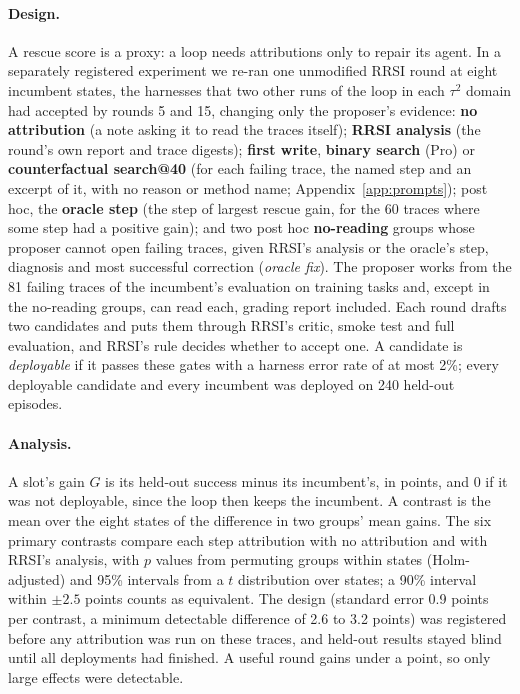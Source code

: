 \documentclass[11pt]{article}
\begin{document}
\paragraph{Design.} A rescue score is a proxy: a loop needs attributions only to repair its agent. In a separately registered experiment we re-ran one unmodified RRSI round at eight incumbent states, the harnesses that two other runs of the loop in each $\tau^2$ domain had accepted by rounds 5 and 15, changing only the proposer's evidence: \textbf{no attribution} (a note asking it to read the traces itself); \textbf{RRSI analysis} (the round's own report and trace digests); \textbf{first write}, \textbf{binary search} (Pro) or \textbf{counterfactual search@40} (for each failing trace, the named step and an excerpt of it, with no reason or method name; Appendix~\ref{app:prompts}); post hoc, the \textbf{oracle step} (the step of largest rescue gain, for the 60 traces where some step had a positive gain); and two post hoc \textbf{no-reading} groups whose proposer cannot open failing traces, given RRSI's analysis or the oracle's step, diagnosis and most successful correction (\emph{oracle fix}). The proposer works from the 81 failing traces of the incumbent's evaluation on training tasks and, except in the no-reading groups, can read each, grading report included. Each round drafts two candidates and puts them through RRSI's critic, smoke test and full evaluation, and RRSI's rule decides whether to accept one. A candidate is \emph{deployable} if it passes these gates with a harness error rate of at most 2\%; every deployable candidate and every incumbent was deployed on 240 held-out episodes.

\paragraph{Analysis.} A slot's gain $G$ is its held-out success minus its incumbent's, in points, and 0 if it was not deployable, since the loop then keeps the incumbent. A contrast is the mean over the eight states of the difference in two groups' mean gains. The six primary contrasts compare each step attribution with no attribution and with RRSI's analysis, with $p$ values from permuting groups within states (Holm-adjusted) and 95\% intervals from a $t$ distribution over states; a 90\% interval within $\pm2.5$ points counts as equivalent. The design (standard error 0.9 points per contrast, a minimum detectable difference of 2.6 to 3.2 points) was registered before any attribution was run on these traces, and held-out results stayed blind until all deployments had finished. A useful round gains under a point, so only large effects were detectable.
\end{document}
